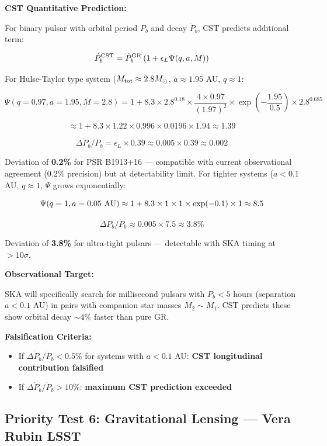 \documentclass[11pt,a4paper]{article}
\providecommand{\tightlist}{\setlength{\itemsep}{0pt}\setlength{\parskip}{0pt}}
\begin{document}
\textbf{CST Quantitative Prediction:}

For binary pulsar with orbital period \(P_b\) and decay \(\dot P_b\),
CST predicts additional term:

\[\dot P_b^{\rm CST} = \dot P_b^{\rm GR} \left(1 + \epsilon_L \Psi(q, a, M)\right)\]

For Hulse-Taylor type system (\(M_{\rm tot} \approx 2.8 M_\odot\),
\(a \approx 1.95\) AU, \(q \approx 1\):

\[\Psi(q=0.97, a=1.95, M=2.8) = 1 + 8.3 \times 2.8^{0.18} \times \frac{4\times0.97}{(1.97)^2} \times \exp\left(-\frac{1.95}{0.5}\right) \times 2.8^{0.685}\]

\[\approx 1 + 8.3 \times 1.22 \times 0.996 \times 0.0196 \times 1.94 \approx 1.39\]

\[\Delta\dot P_b/\dot P_b = \epsilon_L \times 0.39 \approx 0.005 \times 0.39 \approx 0.002\]

Deviation of \textbf{0.2\%} for PSR B1913+16 --- compatible with current
observational agreement (0.2\% precision) but at detectability limit.
For tighter systems (\(a < 0.1\) AU, \(q \approx 1\), \(\Psi\) grows
exponentially:

\[\Psi(q=1, a=0.05~{\rm AU}) \approx 1 + 8.3 \times 1 \times 1 \times \exp(-0.1) \times 1 \approx 8.5\]

\[\Delta\dot P_b/\dot P_b \approx 0.005 \times 7.5 \approx 3.8\%\]

Deviation of \textbf{3.8\%} for ultra-tight pulsars --- detectable with
SKA timing at \(> 10\sigma\).

\textbf{Observational Target:}

SKA will specifically search for millisecond pulsars with \(P_b < 5\)
hours (separation \(a < 0.1\) AU) in pairs with companion star masses
\(M_2 \sim M_1\). CST predicts these show orbital decay \(\sim 4\%\)
faster than pure GR.

\textbf{Falsification Criteria:}

\begin{itemize}
\tightlist
\item
  If \(\Delta\dot P_b/\dot P_b < 0.5\%\) for systems with \(a < 0.1\)
  AU: \textbf{CST longitudinal contribution falsified}
\item
  If \(\Delta\dot P_b/\dot P_b > 10\%\): \textbf{maximum CST prediction
  exceeded}
\end{itemize}

\hypertarget{priority-test-6-gravitational-lensing-vera-rubin-lsst}{%
\subsection{Priority Test 6: Gravitational Lensing --- Vera Rubin
LSST}\label{priority-test-6-gravitational-lensing-vera-rubin-lsst}}
\end{document}

